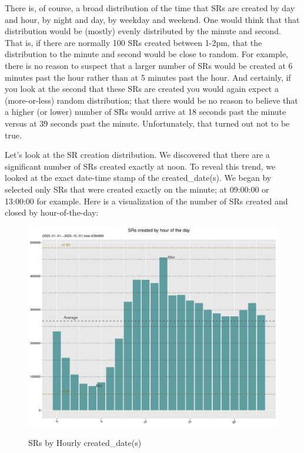 \documentclass[12pt, titlepage]{article}
\begin{document}
{	There is, of course, a broad distribution of the time that SRs are created by day and hour, by night and day, by weekday and weekend. 
	One would think that that distribution would be (mostly) evenly distributed by the minute and second. That is, 
	if there are normally 100 SRs created between 1-2pm, that the distribution to the minute and second 
	would be close to random. For example, there is no reason to suspect that a larger number of SRs would be 
	created at 6 minutes past the hour rather than at 5 minutes past the hour. And certainly, if you look at the second that these SRs
	are created you would again expect a (more-or-less) random distribution; that there would be no reason to believe 
	that a higher (or lower) number of SRs would arrive at 18 seconds past the minute versus at 39 seconds past the minute.
	Unfortunately, that turned out not to be true.
	
	Let's look at the SR creation distribution. We discovered that there are a significant number of SRs created exactly at noon. To reveal this
	trend, we looked at the exact date-time stamp of the created\_date(s). We began by selected only SRs that were created exactly on the minute;
	at 09:00:00 or 13:00:00 for example.  Here is a visualization of the number of SRs created and closed by hour-of-the-day:
	
	\begin{figure}[tbp]
		 \centering
		 \caption{SRs by Hourly created\_date(s)}
		 \includegraphics[width = \textwidth]{Created_Hourly_SR_count.pdf}
		 \label{fig:hourly-created}
	\end{figure}	
	
}
\end{document}

